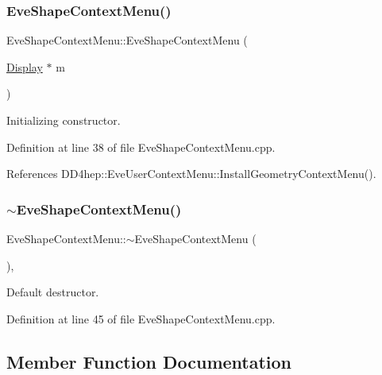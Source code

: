 \subsubsection{\texorpdfstring{Eve\+Shape\+Context\+Menu()}{EveShapeContextMenu()}}
{\footnotesize\ttfamily Eve\+Shape\+Context\+Menu\+::\+Eve\+Shape\+Context\+Menu (\begin{DoxyParamCaption}\item[{\hyperlink{class_d_d4hep_1_1_display}{Display} $\ast$}]{m }\end{DoxyParamCaption})\hspace{0.3cm}{\ttfamily [protected]}}



Initializing constructor. 



Definition at line 38 of file Eve\+Shape\+Context\+Menu.\+cpp.



References D\+D4hep\+::\+Eve\+User\+Context\+Menu\+::\+Install\+Geometry\+Context\+Menu().

\hypertarget{class_d_d4hep_1_1_eve_shape_context_menu_a9e82222657b2932cbdaacf941ca68359}{}\label{class_d_d4hep_1_1_eve_shape_context_menu_a9e82222657b2932cbdaacf941ca68359} 
\subsubsection{\texorpdfstring{$\sim$\+Eve\+Shape\+Context\+Menu()}{~EveShapeContextMenu()}}
{\footnotesize\ttfamily Eve\+Shape\+Context\+Menu\+::$\sim$\+Eve\+Shape\+Context\+Menu (\begin{DoxyParamCaption}{ }\end{DoxyParamCaption})\hspace{0.3cm}{\ttfamily [protected]}, {\ttfamily [virtual]}}



Default destructor. 



Definition at line 45 of file Eve\+Shape\+Context\+Menu.\+cpp.



\subsection{Member Function Documentation}
\hypertarget{class_d_d4hep_1_1_eve_shape_context_menu_a265ec0c7f5d3dd2f384958e32e5c51d9}{}\label{class_d_d4hep_1_1_eve_shape_context_menu_a265ec0c7f5d3dd2f384958e32e5c51d9} 
